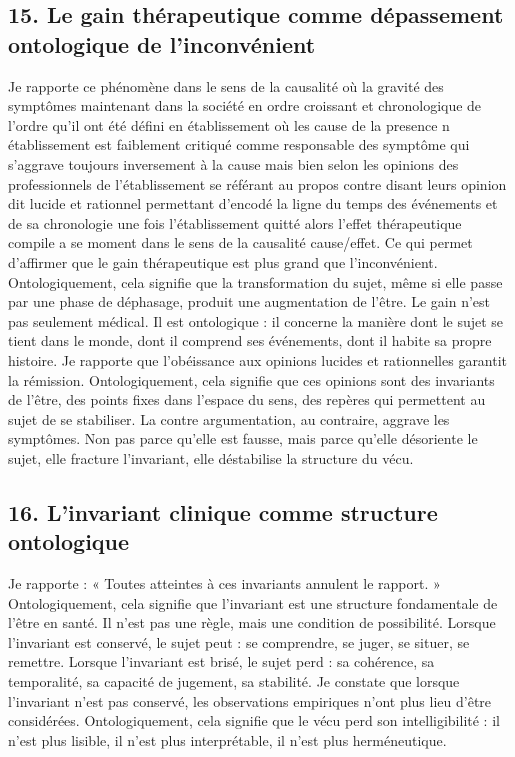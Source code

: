 \documentclass[12pt,letterpaper,oneside]{article}
\begin{document}
\subsection*{15. Le gain thérapeutique comme dépassement ontologique de l’inconvénient}
Je rapporte ce phénomène dans le sens de la causalité où la gravité des symptômes maintenant dans  la société en ordre croissant et chronologique de l’ordre qu’il ont été défini en établissement où les cause de la presence n établissement est faiblement critiqué comme responsable des symptôme qui s’aggrave toujours inversement à la cause  mais bien selon les opinions des professionnels de l’établissement se référant au propos contre disant leurs opinion dit lucide et rationnel permettant d’encodé la ligne du temps des événements et de sa chronologie une fois l’établissement quitté alors l’effet thérapeutique compile a se moment dans le sens de la causalité cause/effet. Ce qui permet d’affirmer que le gain thérapeutique est plus grand que l’inconvénient. Ontologiquement, cela signifie que la transformation du sujet, même si elle passe par une phase de déphasage, produit une augmentation de l’être.
Le gain n’est pas seulement médical. Il est ontologique : il concerne la manière dont le sujet se tient dans le monde, dont il comprend ses événements, dont il habite sa propre histoire.
Je rapporte que l’obéissance aux opinions lucides et rationnelles garantit la rémission. Ontologiquement, cela signifie que ces opinions sont des invariants de l’être, des points fixes dans l’espace du sens, des repères qui permettent au sujet de se stabiliser.
La contre argumentation, au contraire, aggrave les symptômes. Non pas parce qu’elle est fausse, mais parce qu’elle désoriente le sujet, elle fracture l’invariant, elle déstabilise la structure du vécu.

\subsection*{16. L’invariant clinique comme structure ontologique}
Je rapporte :
« Toutes atteintes à ces invariants annulent le rapport. »
Ontologiquement, cela signifie que l’invariant est une structure fondamentale de l’être en santé. Il n’est pas une règle, mais une condition de possibilité.
Lorsque l’invariant est conservé, le sujet peut :
	se comprendre,
	se juger,
	se situer,
	se remettre.
Lorsque l’invariant est brisé, le sujet perd :
	sa cohérence,
	sa temporalité,
	sa capacité de jugement,
	sa stabilité.
Je constate que lorsque l’invariant n’est pas conservé, les observations empiriques n’ont plus lieu d’être considérées. Ontologiquement, cela signifie que le vécu perd son intelligibilité : il n’est plus lisible, il n’est plus interprétable, il n’est plus herméneutique.
\end{document}
